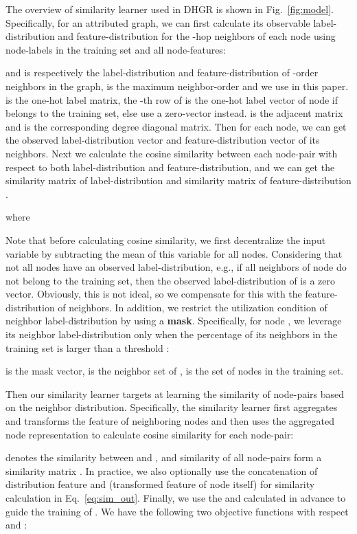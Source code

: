\documentclass[sigconf]{acmart}
\begin{document}
	The overview of similarity learner used in DHGR is shown in Fig.~\ref{fig:model}. Specifically, for an attributed graph, we can first calculate its observable label-distribution  and feature-distribution  for the -hop neighbors of each node using node-labels in the training set and all node-features:
	
	 and  is respectively the label-distribution and feature-distribution of -order neighbors in the graph,  is the maximum neighbor-order and we use  in this paper.  is the one-hot label matrix, the -th row of  is the one-hot label vector of node  if  belongs to the training set, else use a zero-vector instead.  is the adjacent matrix and  is the corresponding degree diagonal matrix. Then for each node, we can get the observed label-distribution vector and feature-distribution vector of its neighbors. Next we calculate the cosine similarity between each node-pair with respect to both label-distribution and feature-distribution, and we can get the similarity matrix of label-distribution  and similarity matrix of feature-distribution .
	
	where
	
	Note that before calculating cosine similarity, we first decentralize the input variable by subtracting the mean of this variable for all nodes. Considering that not all nodes have an observed label-distribution, e.g., if all neighbors of node  do not belong to the training set, then the observed label-distribution of  is a zero vector. Obviously, this is not ideal, so we compensate for this with the feature-distribution of neighbors. In addition, we restrict the utilization condition of neighbor label-distribution by using a \textbf{mask}. Specifically, for node , we  leverage its neighbor label-distribution only when the percentage of its neighbors in the training set is larger than a threshold : 
	
	 is the mask vector,  is the neighbor set of ,  is the set of nodes in the training set.
	
	Then our similarity learner targets at learning the  similarity of node-pairs based on the neighbor distribution. Specifically, the similarity learner first aggregates and transforms the feature of neighboring nodes and then uses the aggregated node representation to calculate cosine similarity for each node-pair:
	
	 denotes the similarity between  and , and similarity of all node-pairs form a similarity matrix . In practice, we also optionally use the concatenation of distribution feature  and   (transformed feature of node itself) for similarity calculation in Eq.~\ref{eq:sim_out}. Finally, we use the   and  calculated in advance to guide the training of . We have the following two objective functions with respect  and :
	
\end{document}

